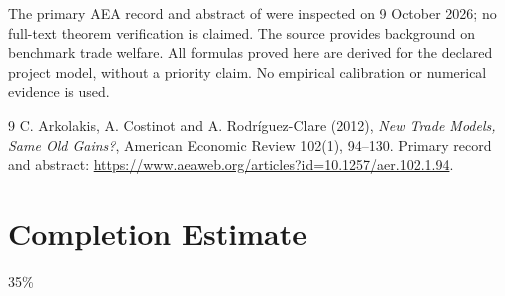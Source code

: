 \documentclass[11pt]{article}
\begin{document}
The primary AEA record and abstract of \cite{ACR} were inspected on
9 October 2026; no full-text theorem verification is claimed. The source
provides background on benchmark trade welfare. All formulas proved here
are derived for the declared project model, without a priority claim.
No empirical calibration or numerical evidence is used.
\begin{thebibliography}{9}
 C. Arkolakis, A. Costinot and A. Rodr\'iguez-Clare (2012),
\emph{New Trade Models, Same Old Gains?}, American Economic Review
102(1), 94--130. Primary record and abstract:
\url{https://www.aeaweb.org/articles?id=10.1257/aer.102.1.94}.
\end{thebibliography}

\section{Completion Estimate}
35\%
\end{document}
